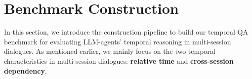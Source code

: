 
\begin{table}[ht]
\small
\centering
{}
\caption{Statistics of the chosen multi-session dialogue dataset, LoCoMo, compared to others.}
\label{tab:locomo_statistics}
\end{table}

\section{Benchmark Construction}
In this section, we introduce the construction pipeline to build our temporal QA benchmark for evaluating LLM-agents' temporal reasoning in multi-session dialogues. As mentioned earlier, we mainly focus on the two temporal characteristics in multi-session dialogues: \textbf{relative time} and \textbf{cross-session dependency}.

